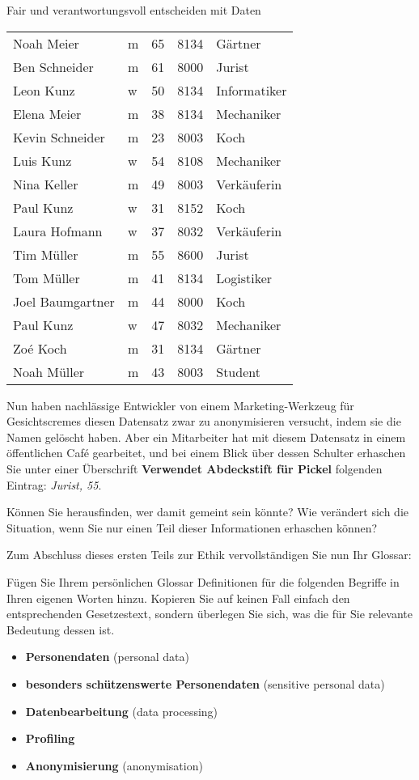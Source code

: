 \begin{lpu}{Fair und verantwortungsvoll entscheiden mit Daten}
\begin{longtable}{llrrl}
Noah Meier & m & 65 & 8134 & Gärtner \\
Ben Schneider & m & 61 & 8000 & Jurist \\
Leon Kunz & w & 50 & 8134 & Informatiker \\
Elena Meier & m & 38 & 8134 & Mechaniker \\
Kevin Schneider & m & 23 & 8003 & Koch \\
Luis Kunz & w & 54 & 8108 & Mechaniker \\
Nina Keller & m & 49 & 8003 & Verkäuferin \\
Paul Kunz & w & 31 & 8152 & Koch \\
Laura Hofmann & w & 37 & 8032 & Verkäuferin \\
Tim Müller & m & 55 & 8600 & Jurist \\
Tom Müller & m & 41 & 8134 & Logistiker \\
Joel Baumgartner & m & 44 & 8000 & Koch \\
Paul Kunz & w & 47 & 8032 & Mechaniker \\
Zoé Koch & m & 31 & 8134 & Gärtner \\
Noah Müller & m & 43 & 8003 & Student \\
\end{longtable}

\begin{aufgabe}{4}
    Nun haben nachlässige Entwickler von einem Marketing-Werkzeug für Gesichtscremes diesen Datensatz zwar zu anonymisieren versucht, indem sie die Namen gelöscht haben. Aber ein Mitarbeiter hat mit diesem Datensatz in einem öffentlichen Café gearbeitet, und bei einem Blick über dessen Schulter erhaschen Sie unter einer Überschrift \textbf{Verwendet Abdeckstift für Pickel} folgenden Eintrag: \textit{Jurist, 55}.

    Können Sie herausfinden, wer damit gemeint sein könnte? Wie verändert sich die Situation, wenn Sie nur einen Teil dieser Informationen erhaschen können?
\end{aufgabe}

Zum Abschluss dieses ersten Teils zur Ethik vervollständigen Sie nun Ihr Glossar:

\begin{aufgabe}{5}
Fügen Sie Ihrem persönlichen Glossar Definitionen für die folgenden Begriffe in Ihren eigenen Worten hinzu. Kopieren Sie auf keinen Fall einfach den entsprechenden Gesetzestext, sondern überlegen Sie sich, was die für Sie relevante Bedeutung dessen ist.

\vspace{0.5em}
\begin{itemize}
  \item \textbf{Personendaten} (personal data)
  \item \textbf{besonders schützenswerte Personendaten} (sensitive personal data)
  \item \textbf{Datenbearbeitung} (data processing)
  \item \textbf{Profiling}
  \item \textbf{Anonymisierung} (anonymisation)
\end{itemize}


\end{aufgabe}
\end{lpu}
